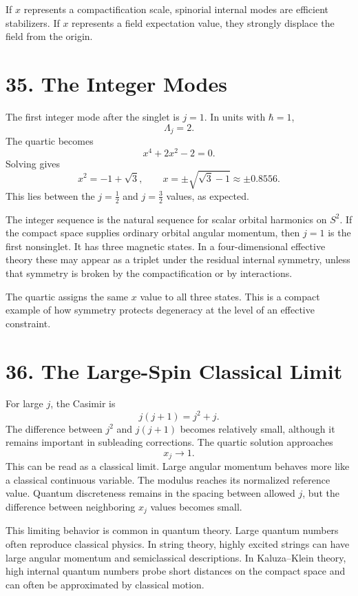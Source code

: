 \documentclass[11pt]{article}
\newcommand{\Lspin}{\Lambda_j}
\newcommand{\hb}{\hbar}
\begin{document}
If \(x\) represents a compactification scale, spinorial internal modes are efficient stabilizers. If \(x\) represents a field expectation value, they strongly displace the field from the origin.


\section*{35. The Integer Modes}

The first integer mode after the singlet is \(j=1\). In units with \(\hb=1\),
\[
        \Lspin=2 .
\]
The quartic becomes
\[
        x^4+2x^2-2=0 .
\]
Solving gives
\[
        x^2=-1+\sqrt{3},
        \qquad
        x=\pm\sqrt{\sqrt{3}-1}
        \approx \pm 0.8556 .
\]
This lies between the \(j=\frac12\) and \(j=\frac32\) values, as expected.

The integer sequence is the natural sequence for scalar orbital harmonics on \(S^2\). If the compact space supplies ordinary orbital angular momentum, then \(j=1\) is the first nonsinglet. It has three magnetic states. In a four-dimensional effective theory these may appear as a triplet under the residual internal symmetry, unless that symmetry is broken by the compactification or by interactions.

The quartic assigns the same \(x\) value to all three states. This is a compact example of how symmetry protects degeneracy at the level of an effective constraint.


\section*{36. The Large-Spin Classical Limit}

For large \(j\), the Casimir is
\[
        j(j+1)=j^2+j .
\]
The difference between \(j^2\) and \(j(j+1)\) becomes relatively small, although it remains important in subleading corrections. The quartic solution approaches
\[
        x_j\to 1 .
\]
This can be read as a classical limit. Large angular momentum behaves more like a classical continuous variable. The modulus reaches its normalized reference value. Quantum discreteness remains in the spacing between allowed \(j\), but the difference between neighboring \(x_j\) values becomes small.

This limiting behavior is common in quantum theory. Large quantum numbers often reproduce classical physics. In string theory, highly excited strings can have large angular momentum and semiclassical descriptions. In Kaluza--Klein theory, high internal quantum numbers probe short distances on the compact space and can often be approximated by classical motion.
\end{document}

